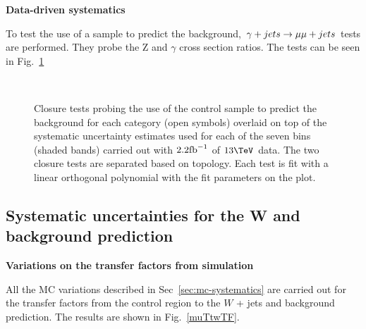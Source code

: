 {\bf Data-driven systematics}

To test the use of a \gj sample to predict the \zinv background, $\gj
\rightarrow \mmj$
tests are performed. They probe the Z and $\gamma$ cross section
ratios. The tests can be seen in Fig.~\ref{fig:closurePhoToMuMu}

\begin{figure}[h!]
  \begin{center}
    ~~
    \caption{Closure tests probing the use of the \gj control sample
      to predict the \znunu background for each
      \njet category (open symbols) overlaid on top of the systematic
      uncertainty estimates used for each of the seven \scalht bins
      (shaded bands) carried out with $2.2\ifb$ of $13\tev$
      data. The two closure tests are separated based on topology.
      Each test is fit with a linear orthogonal polynomial with the
      fit parameters on the plot.}
    \label{fig:closurePhoToMuMu}
  \end{center} 
\end{figure}

\subsection{Systematic uncertainties for the W and \ttbar background
prediction}

{\bf Variations on the transfer factors from simulation}

All the MC variations described in Sec~\ref{sec:mc-systematics} are
carried out for the transfer factors from the \mj control region to
the $W$ + jets and \ttbar background prediction. The results are shown 
in Fig.~\ref{muTtwTF}.

